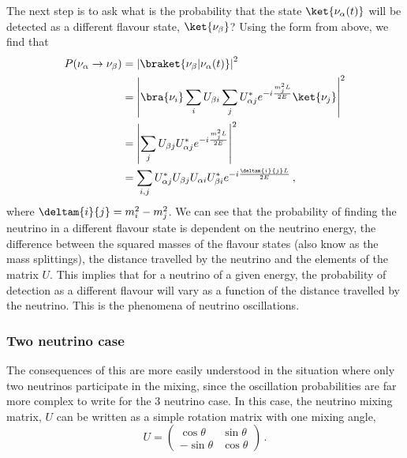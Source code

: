 The next step is to ask what is the probability that the state $\ket{\nu_{\alpha}(t)}$ will be detected as a different flavour state, $\ket{\nu_{\beta}}$?
Using the form from above, we find that
\begin{align}
  P(\nu_{\alpha} \rightarrow \nu_{\beta}) &= \left|\braket{\nu_{\beta} | \nu_{\alpha}(t)} \right|^{2} \\
  &=  \left| \bra{\nu_{i}} \sum_{i} U_{\beta i} \sum_{j} U^{*}_{\alpha j} e^{-i \frac{m^{2}_{j}L}{2E}} \ket{\nu_{j}} \right|^{2} \\
  &= \left| \sum_{j} U_{\beta j} U_{\alpha j}^{*} e^{-i \frac{m^{2}_{j}L}{2E}} \right|^{2} \\
  &= \sum_{i, j} U^{*}_{\alpha j} U_{\beta j} U_{\alpha i} U^{*}_{\beta i} e^{-i \frac{\deltam{i}{j}L}{2E}}  \, , 
  \label{eq:oscillationProb}
\end{align}
where $\deltam{i}{j} = m_{i}^{2} - m_{j}^{2}$.
We can see that the probability of finding the neutrino in a different flavour state is dependent on the neutrino energy, the difference between the squared masses of the flavour states (also know as the mass splittings), the distance travelled by the neutrino and the elements of the matrix $U$.
This implies that for a neutrino of a given energy, the probability of detection as a different flavour will vary as a function of the distance travelled by the neutrino.
This is the phenomena of neutrino oscillations.

\subsubsection{Two neutrino case}
\label{sec:theory:theory:twoNeutrino}
The consequences of this are more easily understood in the situation where only two neutrinos participate in the mixing, since the oscillation probabilities are far more complex to write for the 3 neutrino case.
In this case, the neutrino mixing matrix, $U$ can be written as a simple rotation matrix with one mixing angle,
\begin{equation}
  U =
  \begin{pmatrix}
    \cos\theta  & \sin\theta \\
    -\sin\theta & \cos\theta
  \end{pmatrix} \, .
\end{equation}

